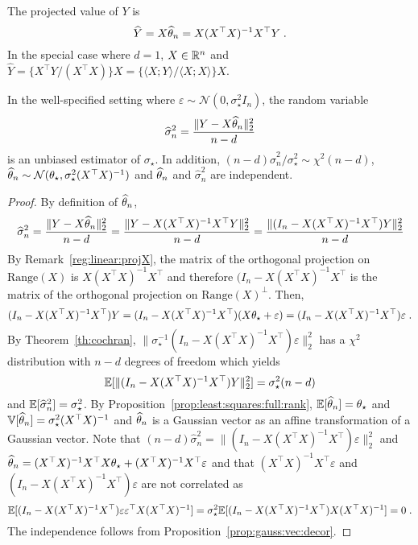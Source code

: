 \begin{remark}
\label{reg:linear:projX:d1}
The projected value of $Y$ is 
$$
\widehat Y = X \widehat {\theta}_n = X(X^\top X)^{-1}X^\top Y\;.
$$
In the special case where $d = 1$, $X\in\mathbb{R}^n$ and $\widehat Y = \{X^\top Y/(X^\top X)\}X = \{\langle X ; Y\rangle / \langle X ; X \rangle\}X $.
\end{remark}

\begin{shaded}
\begin{proposition}
\label{prop:least:squares:full:rank:variance}
In the well-specified setting where $\varepsilon \sim \mathcal{N}(0,\sigma_\star^2I_n)$, the random variable
\[
\widehat \sigma^2_n =\frac{\|Y - X\widehat {\theta}_n \|_2^2}{n-d}
\]
is an unbiased estimator of $\sigma_\star$. In addition, $(n-d)\widehat \sigma^2_n/\sigma_\star^2\sim\chi^2(n-d)$, $\widehat {\theta}_n \sim \mathcal{N}(\theta_{\star},\sigma_\star^2(X^\top X)^{-1})$ and $\widehat {\theta}_n$ and $\widehat \sigma^2_n$ are independent.
\end{proposition}
\end{shaded}

\begin{proof}
By definition of $\widehat {\theta}_n$,
\[
\widehat \sigma^2_n =\frac{\|Y - X\widehat {\theta}_n \|_2^2}{n-d} = \frac{\|Y - X(X^\top X)^{-1}X^\top Y\|_2^2}{n-d} = \frac{\|(I_n - X(X^\top X)^{-1}X^\top )Y\|_2^2}{n-d}
\]
By Remark~\ref{reg:linear:projX}, the matrix of the orthogonal projection on $\mathrm{Range}(X)$ is $X(X^\top X)^{-1}X^\top$ and therefore $(I_n - X(X^\top X)^{-1}X^\top$ is the matrix  of the orthogonal projection on $\mathrm{Range}(X)^{\perp}$. Then,
\[
(I_n - X(X^\top X)^{-1}X^\top)Y = (I_n - X(X^\top X)^{-1}X^\top)(X\theta_\star + \varepsilon) = (I_n - X(X^\top X)^{-1}X^\top)\varepsilon\;.
\]
By Theorem~\ref{th:cochran}, $\|\sigma_\star^{-1}(I_n - X(X^\top X)^{-1}X^\top)\varepsilon\|_2^2$ has a $\chi^2$ distribution with $n-d$ degrees of freedom which yields
\[
\mathbb{E}[\|(I_n - X(X^\top X)^{-1}X^\top)Y\|_2^2] = \sigma_\star^2(n-d)
\]
and $\mathbb{E}[\widehat \sigma^2_n ] = \sigma_\star^2$. By Proposition~\ref{prop:least:squares:full:rank}, $\mathbb{E}[\widehat {\theta}_n] = \theta_\star$ and $\mathbb{V}[\widehat {\theta}_n] = \sigma_\star^2(X^\top X)^{-1}$ and $\widehat {\theta}_n$ is a Gaussian vector as an  affine transformation of a Gaussian vector. Note that $(n-d)\widehat \sigma^2_n = \|(I_n - X(X^\top X)^{-1}X^\top)\varepsilon\|_2^2$ and $\widehat {\theta}_n = (X^\top X)^{-1}X^\top X\theta_{\star} + (X^\top X)^{-1}X^\top\varepsilon$ and that $(X^\top X)^{-1}X^\top\varepsilon$ and $(I_n - X(X^\top X)^{-1}X^\top)\varepsilon$ are not correlated as 
\[
\mathbb{E}[(I_n - X(X^\top X)^{-1}X^\top)\varepsilon \varepsilon^\top X(X^\top X)^{-1}] = \sigma_\star^2\mathbb{E}[(I_n - X(X^\top X)^{-1}X^\top)X(X^\top X)^{-1}] = 0\;.
\]
The independence follows from Proposition~\ref{prop:gauss:vec:decor}.
\end{proof}

